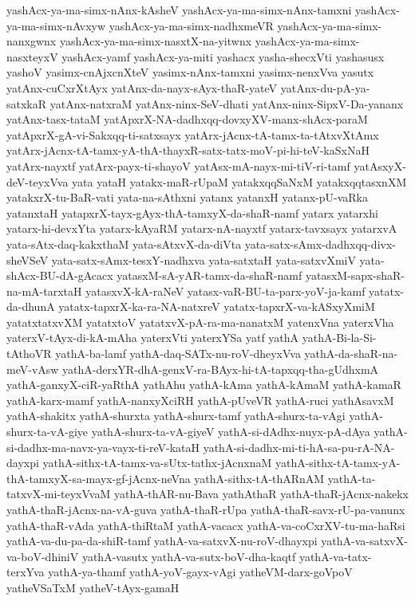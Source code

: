 {yashAcx-ya-ma-simx-nAnx-kAsheV
yashAcx-ya-ma-simx-nAnx-tamxni
yashAcx-ya-ma-simx-nAvxyw
yashAcx-ya-ma-simx-nadhxmeVR
yashAcx-ya-ma-simx-nanxgwnx
yashAcx-ya-ma-simx-nasxtX-na-yitwnx
yashAcx-ya-ma-simx-nasxteyxV
yashAcx-yamf
yashAcx-ya-miti
yashacx
yasha-shecxVti
yashasusx
yashoV
yasimx-cnAjxcnXteV
yasimx-nAnx-tamxni
yasimx-nenxVva
yasutx
yatAnx-cuCxrXtAyx
yatAnx-da-nayx-sAyx-thaR-yateV
yatAnx-du-pA-ya-satxkaR
yatAnx-natxraM
yatAnx-ninx-SeV-dhati
yatAnx-ninx-SipxV-Da-yananx
yatAnx-tasx-tataM
yatApxrX-NA-dadhxqq-dovxyXV-manx-shAcx-paraM
yatApxrX-gA-vi-Sakxqq-ti-satxsayx
yatArx-jAcnx-tA-tamx-ta-tAtxvXtAmx
yatArx-jAcnx-tA-tamx-yA-thA-thayxR-satx-tatx-moV-pi-hi-teV-kaSxNaH
yatArx-nayxtf
yatArx-payx-ti-shayoV
yatAsx-mA-nayx-mi-tiV-ri-tamf
yatAsxyX-deV-teyxVva
yata
yataH
yatakx-maR-rUpaM
yatakxqqSaNxM
yatakxqqtasxnXM
yatakxrX-tu-BaR-vati
yata-na-sAthxni
yatanx
yatanxH
yatanx-pU-vaRka
yatanxtaH
yatapxrX-tayx-gAyx-thA-tamxyX-da-shaR-namf
yatarx
yatarxhi
yatarx-hi-devxYta
yatarx-kAyaRM
yatarx-nA-nayxtf
yatarx-tavxsayx
yatarxvA
yata-sAtx-daq-kakxthaM
yata-sAtxvX-da-diVta
yata-satx-sAmx-dadhxqq-divx-sheVSeV
yata-satx-sAmx-tesxY-nadhxva
yata-satxtaH
yata-satxvXmiV
yata-shAcx-BU-dA-gAcacx
yatasxM-sA-yAR-tamx-da-shaR-namf
yatasxM-sapx-shaR-na-mA-tarxtaH
yatasxvX-kA-raNeV
yatasx-vaR-BU-ta-parx-yoV-ja-kamf
yatatx-da-dhunA
yatatx-tapxrX-ka-ra-NA-natxreV
yatatx-tapxrX-va-kASxyXmiM
yatatxtatxvXM
yatatxtoV
yatatxvX-pA-ra-ma-nanatxM
yatenxVna
yaterxVha
yaterxV-tAyx-di-kA-mAha
yaterxVti
yaterxYSa
yatf
yathA
yathA-Bi-la-Si-tAthoVR
yathA-ba-lamf
yathA-daq-SATx-nu-roV-dheyxVva
yathA-da-shaR-na-meV-vAsw
yathA-derxYR-dhA-genxV-ra-BAyx-hi-tA-tapxqq-tha-gUdhxmA
yathA-ganxyX-ciR-yaRthA
yathAhu
yathA-kAma
yathA-kAmaM
yathA-kamaR
yathA-karx-mamf
yathA-nanxyXciRH
yathA-pUveVR
yathA-ruci
yathAsavxM
yathA-shakitx
yathA-shurxta
yathA-shurx-tamf
yathA-shurx-ta-vAgi
yathA-shurx-ta-vA-giye
yathA-shurx-ta-vA-giyeV
yathA-si-dAdhx-nuyx-pA-dAya
yathA-si-dadhx-ma-navx-ya-vayx-ti-reV-kataH
yathA-si-dadhx-mi-ti-hA-sa-pu-rA-NA-dayxpi
yathA-sithx-tA-tamx-va-sUtx-tathx-jAcnxnaM
yathA-sithx-tA-tamx-yA-thA-tamxyX-sa-mayx-gf-jAcnx-neVna
yathA-sithx-tA-thARnAM
yathA-ta-tatxvX-mi-teyxVvaM
yathA-thAR-nu-Bava
yathAthaR
yathA-thaR-jAcnx-nakekx
yathA-thaR-jAcnx-na-vA-guva
yathA-thaR-rUpa
yathA-thaR-savx-rU-pa-vanunx
yathA-thaR-vAda
yathA-thiRtaM
yathA-vacacx
yathA-va-coCxrXV-tu-ma-haRsi
yathA-va-du-pa-da-shiR-tamf
yathA-va-satxvX-nu-roV-dhayxpi
yathA-va-satxvX-va-boV-dhiniV
yathA-vasutx
yathA-va-sutx-boV-dha-kaqtf
yathA-va-tatx-terxYva
yathA-ya-thamf
yathA-yoV-gayx-vAgi
yatheVM-darx-goVpoV
yatheVSaTxM
yatheV-tAyx-gamaH
}
